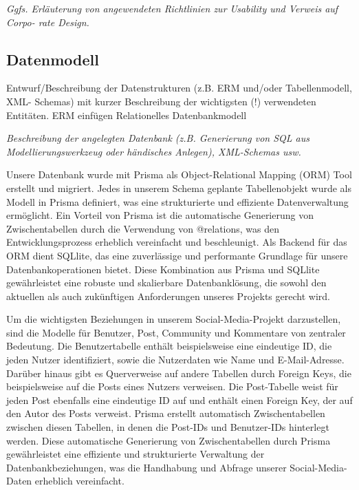 \documentclass[a4paper,12pt]{article}
\begin{document}
\textit{
Ggfs. Erläuterung von angewendeten Richtlinien zur Usability und Verweis auf
Corpo- rate Design.}

\subsection{Datenmodell}
Entwurf/Beschreibung der Datenstrukturen (z.B. ERM
und/oder Tabellenmodell, XML- Schemas) mit kurzer Beschreibung der wichtigsten
(!) verwendeten Entitäten. ERM einfügen 
Relationelles Datenbankmodell 

\textit{Beschreibung der angelegten Datenbank (z.B. Generierung von SQL aus Modellierungswerkzeug oder händisches Anlegen), XML-Schemas usw.}

Unsere Datenbank wurde mit Prisma als Object-Relational Mapping (ORM) Tool erstellt und migriert. Jedes in unserem Schema geplante Tabellenobjekt wurde als Modell in Prisma definiert, was eine strukturierte und effiziente Datenverwaltung ermöglicht. Ein Vorteil von Prisma ist die automatische Generierung von Zwischentabellen durch die Verwendung von @relations, was den Entwicklungsprozess erheblich vereinfacht und beschleunigt. Als Backend für das ORM dient SQLlite, das eine zuverlässige und performante Grundlage für unsere Datenbankoperationen bietet. Diese Kombination aus Prisma und SQLlite gewährleistet eine robuste und skalierbare Datenbanklösung, die sowohl den aktuellen als auch zukünftigen Anforderungen unseres Projekts gerecht wird.

Um die wichtigsten Beziehungen in unserem Social-Media-Projekt darzustellen, sind die Modelle für Benutzer, Post, Community und Kommentare von zentraler Bedeutung. Die Benutzertabelle enthält beispielsweise eine eindeutige ID, die jeden Nutzer identifiziert, sowie die Nutzerdaten wie Name und E-Mail-Adresse. Darüber hinaus gibt es Querverweise auf andere Tabellen durch Foreign Keys, die beispielsweise auf die Posts eines Nutzers verweisen. Die Post-Tabelle weist für jeden Post ebenfalls eine eindeutige ID auf und enthält einen Foreign Key, der auf den Autor des Posts verweist. Prisma erstellt automatisch Zwischentabellen zwischen diesen Tabellen, in denen die Post-IDs und Benutzer-IDs hinterlegt werden. Diese automatische Generierung von Zwischentabellen durch Prisma gewährleistet eine effiziente und strukturierte Verwaltung der Datenbankbeziehungen, was die Handhabung und Abfrage unserer Social-Media-Daten erheblich vereinfacht. 
\end{document}
